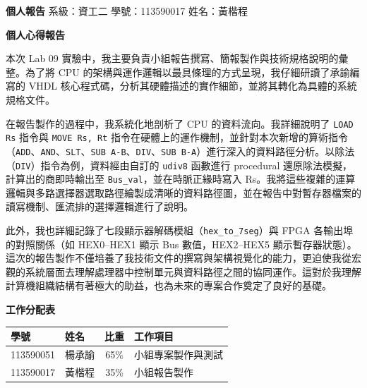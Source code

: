 \documentclass[12pt, a4paper]{article}
\begin{document}
\noindent
\textbf{個人報告} \hfill 系級：資工二 \quad 學號：113590017 \quad 姓名：黃楷程

\vspace{1.5em}
\begin{center}
    {\Large \textbf{個人心得報告}}
\end{center}
\vspace{1em}

本次 Lab 09 實驗中，我主要負責小組報告撰寫、簡報製作與技術規格說明的彙整。為了將 CPU 的架構與運作邏輯以最具條理的方式呈現，我仔細研讀了承諭編寫的 VHDL 核心程式碼，分析其硬體描述的實作細節，並將其轉化為具體的系統規格文件。

在報告製作的過程中，我系統化地剖析了 CPU 的資料流向。我詳細說明了 \texttt{LOAD Rs} 指令與 \texttt{MOVE Rs, Rt} 指令在硬體上的運作機制，並針對本次新增的算術指令（\texttt{ADD}、\texttt{AND}、\texttt{SLT}、\texttt{SUB A-B}、\texttt{DIV}、\texttt{SUB B-A}）進行深入的資料路徑分析。以除法（\texttt{DIV}）指令為例，資料經由自訂的 \texttt{udiv8} 函數進行 procedural 還原除法模擬，計算出的商即時輸出至 \texttt{Bus\_val}，並在時脈正緣時寫入 Rs。我將這些複雜的運算邏輯與多路選擇器選取路徑繪製成清晰的資料路徑圖，並在報告中對暫存器檔案的讀寫機制、匯流排的選擇邏輯進行了說明。

此外，我也詳細記錄了七段顯示器解碼模組（\texttt{hex\_to\_7seg}）與 FPGA 各輸出埠的對照關係（如 HEX0--HEX1 顯示 Bus 數值，HEX2--HEX5 顯示暫存器狀態）。這次的報告製作不僅培養了我技術文件的撰寫與架構視覺化的能力，更迫使我從宏觀的系統層面去理解處理器中控制單元與資料路徑之間的協同運作。這對於我理解計算機組織結構有著極大的助益，也為未來的專案合作奠定了良好的基礎。

\vspace{2em}
\noindent
\textbf{工作分配表}
\vspace{0.5em}

\begin{table}[H]
    \centering
    \begin{tabular}{llcl}
        \toprule
        \textbf{學號} & \textbf{姓名} & \textbf{比重} & \textbf{工作項目} \\ \midrule
        113590051 & 楊承諭 & 65\% & 小組專案製作與測試 \\
        113590017 & 黃楷程 & 35\% & 小組報告製作 \\ \bottomrule
    \end{tabular}
\end{table}
\end{document}

